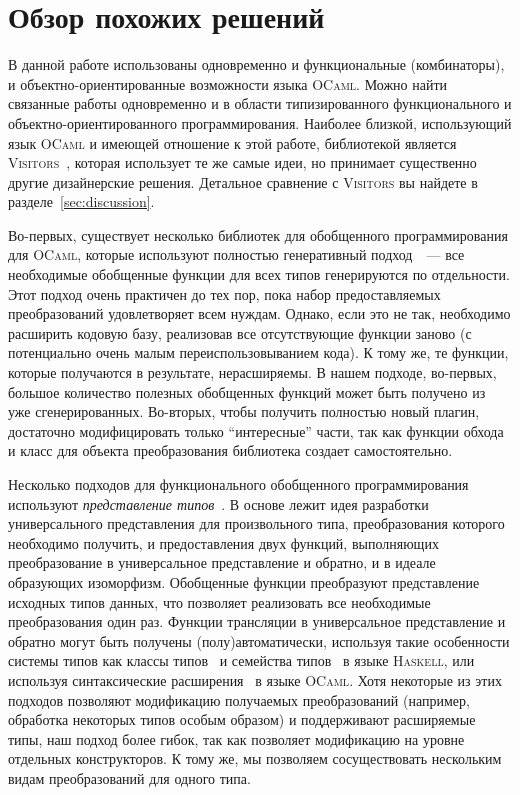\section{Обзор похожих решений}
\label{sec:relatedworks}

В данной работе использованы одновременно и функциональные (комбинаторы), и объектно-ориентированные возможности языка \textsc{OCaml}. Можно найти связанные работы  одновременно и в области типизированного функционального и объектно-ориентированного программирования. Наиболее близкой, использующий язык \textsc{OCaml} и имеющей отношение к этой работе, библиотекой является \textsc{Visitors}~\cite{Visitors}, которая использует те же самые идеи, но принимает существенно другие дизайнерские решения. Детальное сравнение с \textsc{Visitors} вы найдете в разделе~\ref{sec:discussion}.

Во-первых, существует несколько библиотек для обобщенного программирования для \textsc{OCaml}, которые используют полностью генеративный подход~\cite{Yallop,PPXLib}~--- все необходимые обобщенные функции для всех типов генерируются по отдельности. Этот подход очень практичен до тех пор, пока набор предоставляемых преобразований удовлетворяет всем нуждам. Однако, если это не так, необходимо расширить кодовую базу, реализовав все отсутствующие функции заново
(с потенциально очень малым переиспользовыванием кода). К тому же, те функции,
которые получаются в результате, нерасширяемы. В нашем подходе, во-первых,
большое количество полезных обобщенных функций может быть получено из уже сгенерированных. Во-вторых, чтобы получить полностью новый плагин, достаточно модифицировать только ``интересные'' части, так как функции обхода и класс для объекта преобразования библиотека создает самостоятельно.

Несколько подходов для функционального обобщенного программирования используют 
\emph{представление типов}~\cite{Hinze}. В основе лежит идея разработки универсального представления для произвольного типа, преобразования которого необходимо получить, и предоставления двух функций, выполняющих преобразование в универсальное представление и обратно, и в идеале образующих изоморфизм. Обобщенные функции преобразуют представление исходных типов данных, что позволяет реализовать все необходимые преобразования один раз. Функции трансляции в универсальное представление и обратно могут быть получены (полу)автоматически, используя такие особенности системы типов  как классы типов~\cite{Hinze,ALaCarte} и семейства типов~\cite{InstantGenerics} в языке \textsc{Haskell}, или  используя синтаксические расширения~\cite{GenericOCaml} в языке \textsc{OCaml}. Хотя некоторые из этих подходов позволяют модификацию получаемых преобразований (например, обработка некоторых типов особым образом) и поддерживают расширяемые типы, наш подход более гибок, так как позволяет модификацию на уровне отдельных конструкторов. К тому же, мы позволяем сосуществовать нескольким видам преобразований для одного типа.

